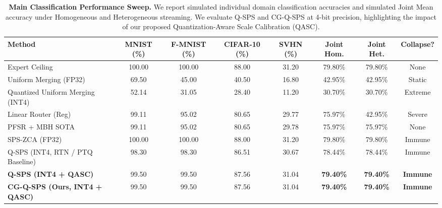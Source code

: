 \begin{table}[t]
\caption{\textbf{Main Classification Performance Sweep.} We report simulated individual domain classification accuracies and simulated Joint Mean accuracy under Homogeneous and Heterogeneous streaming. We evaluate Q-SPS and CG-Q-SPS at 4-bit precision, highlighting the impact of our proposed Quantization-Aware Scale Calibration (QASC).}
\label{tab:classification_results}
\vskip 0.15in
\begin{center}
\begin{scriptsize}
\begin{sc}
\setlength{\tabcolsep}{3.5pt}
\begin{tabular}{lccccccc}
\toprule
Method & MNIST (\%) & F-MNIST (\%) & CIFAR-10 (\%) & SVHN (\%) & Joint Hom. & Joint Het. & Collapse? \\
\midrule
Expert Ceiling & 100.00 & 100.00 & 88.00 & 31.20 & 79.80\% & 79.80\% & None \\
Uniform Merging (FP32) & 69.50 & 45.00 & 40.50 & 16.80 & 42.95\% & 42.95\% & Static \\
Quantized Uniform Merging (INT4) & 52.14 & 31.05 & 28.40 & 11.20 & 30.70\% & 30.70\% & Extreme \\
Linear Router (Reg) & 99.11 & 95.02 & 80.65 & 29.77 & 75.97\% & 42.95\% & Severe \\
PFSR + MBH SOTA & 99.11 & 95.02 & 80.65 & 29.78 & 75.97\% & 75.97\% & None \\
SPS-ZCA (FP32) & 100.00 & 100.00 & 88.00 & 31.20 & 79.80\% & 79.80\% & Immune \\
\midrule
Q-SPS (INT4, RTN / PTQ Baseline) & 98.30 & 98.30 & 86.51 & 30.67 & 78.44\% & 78.44\% & Immune \\
\textbf{Q-SPS (INT4 + QASC)} & 99.50 & 99.50 & 87.56 & 31.04 & \textbf{79.40\%} & \textbf{79.40\%} & \textbf{Immune} \\
\textbf{CG-Q-SPS (Ours, INT4 + QASC)} & 99.50 & 99.50 & 87.56 & 31.04 & \textbf{79.40\%} & \textbf{79.40\%} & \textbf{Immune} \\
\bottomrule
\end{tabular}
\end{sc}
\end{scriptsize}
\end{center}
\vskip -0.1in
\end{table}

